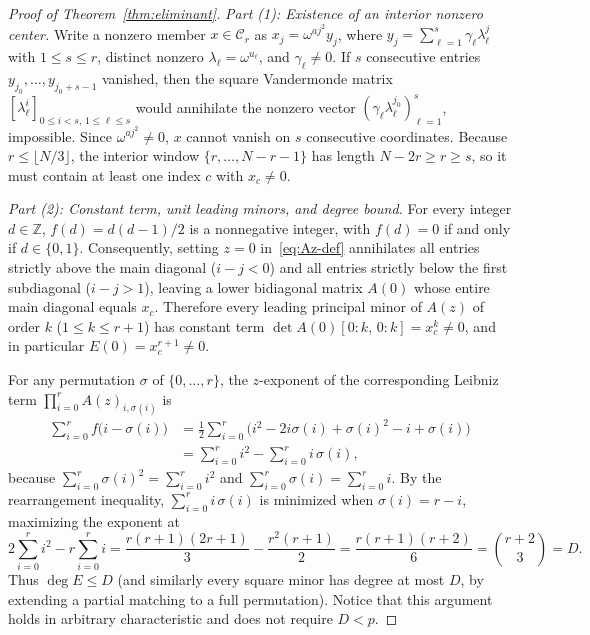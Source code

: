 \documentclass[11pt,reqno]{amsart}
\numberwithin{equation}{section}
\theoremstyle{definition}
\theoremstyle{remark}
\newcommand{\Z}{\mathbb{Z}}
\begin{document}
\begin{proof}[Proof of Theorem~\ref{thm:eliminant}]
\emph{Part (1): Existence of an interior nonzero center.} Write a nonzero member $x\in\mathcal{C}_r$ as $x_j = \omega^{aj^2} y_j$, where $y_j = \sum_{\ell=1}^s \gamma_\ell \lambda_\ell^j$ with $1\le s\le r$, distinct nonzero $\lambda_\ell = \omega^{u_\ell}$, and $\gamma_\ell\neq 0$. If $s$ consecutive entries $y_{j_0},\ldots,y_{j_0+s-1}$ vanished, then the square Vandermonde matrix $[\lambda_\ell^i]_{0\le i<s,\,1\le\ell\le s}$ would annihilate the nonzero vector $(\gamma_\ell \lambda_\ell^{j_0})_{\ell=1}^s$, impossible. Since $\omega^{aj^2}\neq 0$, $x$ cannot vanish on $s$ consecutive coordinates. Because $r\le \lfloor N/3\rfloor$, the interior window $\{r,\ldots,N-r-1\}$ has length $N - 2r \ge r \ge s$, so it must contain at least one index $c$ with $x_c\neq 0$.

\smallskip
\noindent\emph{Part (2): Constant term, unit leading minors, and degree bound.} For every integer $d\in\Z$, $f(d) = d(d-1)/2$ is a nonnegative integer, with $f(d)=0$ if and only if $d\in\{0,1\}$. Consequently, setting $z=0$ in~\eqref{eq:Az-def} annihilates all entries strictly above the main diagonal ($i - j < 0$) and all entries strictly below the first subdiagonal ($i - j > 1$), leaving a lower bidiagonal matrix $A(0)$ whose entire main diagonal equals $x_c$. Therefore every leading principal minor of $A(z)$ of order $k$ ($1\le k\le r+1$) has constant term $\det A(0)[0{:}k,\,0{:}k] = x_c^k\neq 0$, and in particular $E(0) = x_c^{r+1}\neq 0$.

For any permutation $\sigma$ of $\{0,\ldots,r\}$, the $z$-exponent of the corresponding Leibniz term $\prod_{i=0}^r A(z)_{i,\sigma(i)}$ is
\begin{align*}
\sum_{i=0}^r f\bigl(i - \sigma(i)\bigr)
&= \frac{1}{2}\sum_{i=0}^r \bigl(i^2 - 2i\sigma(i) + \sigma(i)^2 - i + \sigma(i)\bigr)\\
&= \sum_{i=0}^r i^2 - \sum_{i=0}^r i\,\sigma(i),
\end{align*}
because $\sum_{i=0}^r \sigma(i)^2 = \sum_{i=0}^r i^2$ and $\sum_{i=0}^r \sigma(i) = \sum_{i=0}^r i$. By the rearrangement inequality, $\sum_{i=0}^r i\,\sigma(i)$ is minimized when $\sigma(i) = r - i$, maximizing the exponent at
\[
2\sum_{i=0}^r i^2 - r\sum_{i=0}^r i
= \frac{r(r+1)(2r+1)}{3} - \frac{r^2(r+1)}{2}
= \frac{r(r+1)(r+2)}{6} = \binom{r+2}{3} = D.
\]
Thus $\deg E \le D$ (and similarly every square minor has degree at most $D$, by extending a partial matching to a full permutation). Notice that this argument holds in arbitrary characteristic and does not require $D < p$.


\end{proof}
\end{document}
